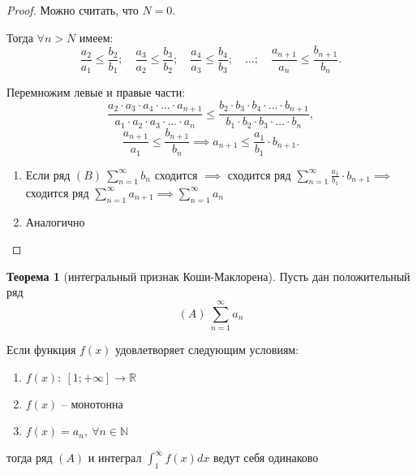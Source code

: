 \documentclass{report}
\theoremstyle{definition}
\newtheorem{theorem}{Теорема}[section]
\begin{document}
\begin{proof}
  Можно считать, что $N = 0$.

  Тогда $\forall n > N$ имеем:
  \begin{equation*}
    \frac{a_2}{a_1}\leqslant\frac{b_2}{b_1}; \quad \frac{a_3}{a_2}\leqslant\frac{b_3}{b_2}; \quad \frac{a_4}{a_3}\leqslant\frac{b_4}{b_3}; \quad \ldots; \quad \frac{a_{n+1}}{a_n} \leqslant \frac{b_{n+1}}{b_n}.
  \end{equation*}

  Перемножим левые и правые части:
  \begin{equation*}
    \frac{a_2 \cdot a_3 \cdot a_4 \cdot \ldots \cdot a_{n+1}}{a_1 \cdot a_2 \cdot a_3 \cdot \ldots \cdot a_n} \leqslant \frac{b_2 \cdot b_3 \cdot b_4 \cdot \ldots \cdot b_{n+1}}{b_1 \cdot b_2 \cdot b_3 \cdot \ldots \cdot b_n},
  \end{equation*}
  \begin{equation*}
    \frac{a_{n+1}}{a_1} \leqslant \frac{b_{n+1}}{b_n} \implies a_{n+1} \leqslant \frac{a_1}{b_1}\cdot b_{n+1}.
  \end{equation*}
  \begin{enumerate}
    \item Если ряд $(B) \ \sum_{n=1}^{\infty}b_n$ сходится $\implies$ сходится ряд $\sum_{n=1}^{\infty}\frac{a_1}{b_1}\cdot b_{n+1} \implies$ сходится ряд $\sum_{n=1}^{\infty}a_{n+1} \implies \sum_{n=1}^{\infty}a_n$
    \item Аналогично
  \end{enumerate}
\end{proof}

\begin{theorem}[интегральный признак Коши-Маклорена]
  Пусть дан положительный ряд
  \begin{equation*}
    (A) \ \sum_{n=1}^{\infty}a_n
  \end{equation*}

  Если функция $f(x)$ удовлетворяет следующим условиям:
  \begin{enumerate}
    \item $f(x): \ [1;+\infty] \rightarrow\mathbb{R}$
    \item $f(x)$ -- монотонна
    \item $f(x) = a_n, \ \forall n \in \mathbb{N}$
  \end{enumerate}
  тогда ряд $(A)$ и интеграл $\int_{1}^{\infty}f(x)dx$ ведут себя одинаково
\end{theorem}
\end{document}
